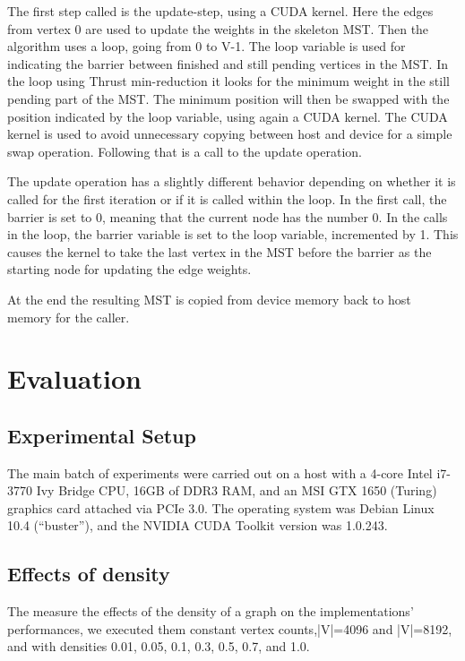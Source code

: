 \documentclass[sigconf,nonacm]{acmart}
\begin{document}
The first step called is the update-step, using a CUDA kernel. Here the edges from vertex 0 are used to update the weights in the skeleton MST.
Then the algorithm uses a loop, going from 0 to V-1. The loop variable is used for indicating the barrier between finished and still pending vertices in the MST. In the loop using Thrust min-reduction it looks for the minimum weight in the still pending part of the MST. The minimum position will then be swapped with the position indicated by the loop variable, using again a CUDA kernel. The CUDA kernel is used to avoid unnecessary copying between host and device for a simple swap operation. Following that is a call to the update operation.

The update operation has a slightly different behavior depending on whether it is called for the first iteration or if it is called within the loop. In the first call, the barrier is set to 0, meaning that the current node has the number 0. In the calls in the loop, the barrier variable is set to the loop variable, incremented by 1. This causes the kernel to take the last vertex in the MST before the barrier as the starting node for updating the edge weights.

At the end the resulting MST is copied from device memory back to host memory for the caller.

\section{Evaluation}

\subsection{Experimental Setup}


The main batch of experiments were carried out on a host with a 4-core Intel i7-3770 Ivy Bridge CPU, 16GB of DDR3 RAM, and an MSI GTX 1650  (Turing) graphics card attached via PCIe 3.0. The operating system was Debian Linux 10.4 (“buster”), and the NVIDIA CUDA Toolkit version was 1.0.243.

\subsection{Effects of density}

The measure the effects of the density of a graph on the implementations’ performances, we executed them constant vertex counts,|V|=4096 and |V|=8192, and with densities 0.01, 0.05, 0.1, 0.3, 0.5, 0.7, and 1.0.
\end{document}
